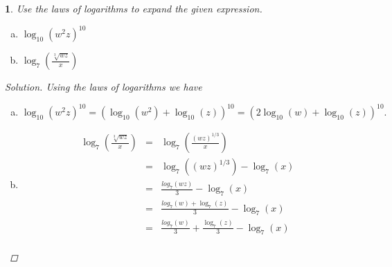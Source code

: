 \documentclass[12pt]{amsart}
\newtheorem{thm}{}
\begin{document}
\setcounter{thm}{15} 
\begin{thm}
  Use the laws of logarithms to expand the given expression.
  \begin{enumerate}[(a)]
  \item
    $\log_{10}(w^2z)^{10}$
  \item
    $\log_7\left(\frac{\sqrt[3]{wz}}{x}\right)$
  \end{enumerate}
  

  \begin{proof}[Solution]
    Using the laws of logarithms we have
    \begin{enumerate}[(a)]
    \item
      $$\log_{10}(w^2z)^{10} = (\log_{10}(w^2) + \log_{10}(z))^{10} = (2\log_{10}(w) + \log_{10}(z))^{10}.$$
    \item
      \begin{eqnarray*}
        \log_7\left(\frac{\sqrt[3]{wz}}{x}\right) &=& \log_7\left(\frac{(wz)^{1/3}}{x}\right)\\
        &=& \log_7((wz)^{1/3}) - \log_7(x)\\
        &=& \frac{log_7(wz)}{3} - \log_7(x)\\
        &=& \frac{log_7(w) + \log_7(z)}{3} - \log_7(x)\\
        &=& \frac{log_7(w)}{3} + \frac{\log_7(z)}{3} - \log_7(x)\\
      \end{eqnarray*}
    \end{enumerate}
  \end{proof}
\end{thm}
\end{document}
